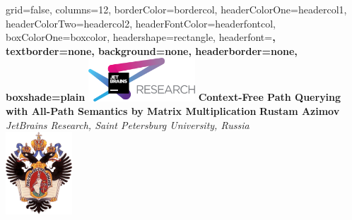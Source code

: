 \documentclass[a0paper,portrait]{baposter}
\begin{document}
\setlength{\fboxsep}{0pt}


\begin{poster}{
grid=false,
columns=12, %
borderColor=bordercol, %
headerColorOne=headercol1, %
headerColorTwo=headercol2, %
headerFontColor=headerfontcol, %
boxColorOne=boxcolor, %
headershape=rectangle, %
headerfont=\Large\sf\bf, %
textborder=none,
background=none,
headerborder=none, %
boxshade=plain
}
{\includegraphics[width=4cm]{jr.png}}
%
%
{\bf \huge{Context-Free Path Querying with All-Path Semantics by Matrix Multiplication} }
{\vspace{0.6em} \smaller \textbf{Rustam Azimov} \\  %
\smaller \it {JetBrains Research, Saint Petersburg University, Russia } \\ %
}
{\includegraphics[width=2.5cm]{SPbGU_Logo.png}} %



\end{poster}
\end{document}
